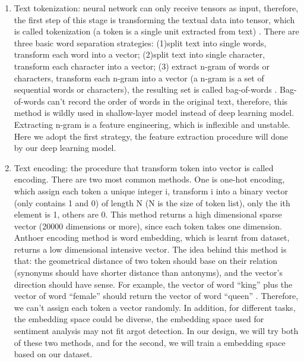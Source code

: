 \begin{enumerate}
    \item Text tokenization: neural network can only receive tensors as input, therefore, the first step of this stage is transforming the textual data into tensor, which is called tokenization (a token is a single unit extracted from text) \cite{Chollet:2017:DLP:3203489}. There are three basic word separation strategies: (1)split text into single words, transform each word into a vector; (2)split text into single character, transform each character into a vector; (3) extract n-gram of words or characters, transform each n-gram into a vector (a n-gram is a set of sequential words or characters), the resulting set is called bag-of-words \cite{Chollet:2017:DLP:3203489}. Bag-of-words can't record the order of words in the original text, therefore, this method is wildly used in shallow-layer model instead of deep learning model. Extracting n-gram is a feature engineering, which is inflexible and unstable. Here we adopt the first strategy, the feature extraction procedure will done by our deep learning model.
    \item Text encoding: the procedure that transform token into vector is called encoding. There are two most common methods. One is one-hot encoding, which assign each token a unique integer i, transform i into a binary vector (only contains 1 and 0) of length N (N is the size of token list), only the ith element is 1, others are 0. This method returns a high dimensional sparse vector (20000 dimensions or more), since each token takes one dimension. Anthoer encoding method is word embedding, which is learnt from dataset, returns a low dimensional intensive vector. The idea behind this method is that: the geometrical distance of two token should base on their relation (synonyms should have shorter distance than antonyms), and the vector's direction should have sense. For example, the vector of word ``king'' plus the vector of word ``female'' should return the vector of word ``queen'' \cite{Chollet:2017:DLP:3203489}. Therefore, we can't assign each token a vector randomly. In addition, for different tasks, the embedding space could be diverse, the embedding space used for sentiment analysis may not fit argot detection. In our design, we will try both of these two methods, and for the second, we will train a embedding space based on our dataset.
\end{enumerate}
